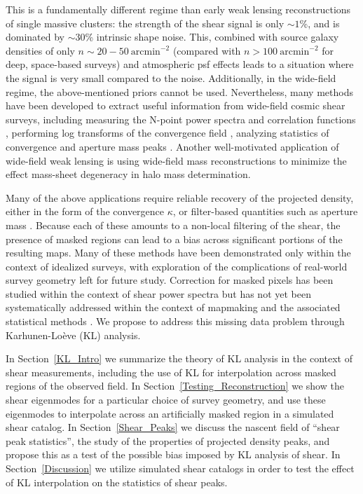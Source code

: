 This is a fundamentally different regime 
than early weak lensing reconstructions
of single massive clusters: the strength of the shear signal is only
$\sim 1$\%, and is dominated by $\sim 30$\% intrinsic shape noise.  
This, combined with source galaxy densities of only 
$n \sim 20-50\ \mathrm{arcmin}^{-2}$
(compared with $n > 100\ \mathrm{arcmin}^{-2}$ for deep, space-based surveys)
and atmospheric psf effects leads to a situation where the signal is 
very small compared to the noise.  
Additionally, in the wide-field regime,
the above-mentioned priors cannot be used.  
Nevertheless, many methods have been developed to extract useful
information from wide-field cosmic shear surveys, including
measuring the N-point power spectra and correlation functions 
\citep{Schneider02,Takada04,Hikage10}, 
performing log transforms of the convergence field 
\citep{Neyrinck09,Neyrinck10,Scherrer10,Seo11},
analyzing statistics of convergence and aperture mass peaks 
\citep{Marian10,Dietrich10,Schmidt10,Kratochvil10,Maturi11}.
Another well-motivated application of wide-field weak lensing 
is using wide-field mass reconstructions to minimize the effect
mass-sheet degeneracy in halo mass determination.

Many of the above applications require reliable recovery of 
the projected density, 
either in the form of the convergence $\kappa$, or filter-based quantities 
such as aperture mass \citep{Schneider98}.  
Because each of these amounts to a non-local filtering of the shear, 
the presence of masked regions can lead to a bias across significant
portions of the resulting maps.  Many of these methods have been demonstrated 
only within the context of idealized surveys, with exploration of the 
complications of real-world survey geometry left for future study.  
Correction for masked pixels has been studied within the context 
of shear power spectra \citep{Schneider10,Hikage10}
but has not yet been systematically addressed
within the context of mapmaking and the associated statistical methods
\citep[see, however,][for some possible approaches]{Padmanabhan03,Pires09}.
We propose to address this missing data problem through 
Karhunen-Lo\`{e}ve (KL) analysis.

In Section~\ref{KL_Intro} we summarize the theory of KL analysis in the
context of shear measurements, including the use of KL for interpolation
across masked regions of the observed field.
In Section~\ref{Testing_Reconstruction} we show the shear eigenmodes for
a particular choice of survey geometry, and use these eigenmodes to
interpolate across an artificially masked region in a simulated shear catalog.
In Section~\ref{Shear_Peaks} we discuss the nascent field of 
``shear peak statistics'',
the study of the properties of projected density peaks, and propose this
as a test of the possible bias imposed by KL analysis of shear.
In Section~\ref{Discussion} we utilize simulated shear catalogs 
in order to test the effect of KL interpolation on
the statistics of shear peaks.

